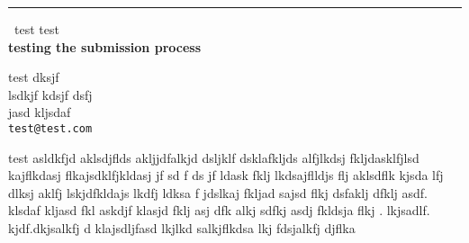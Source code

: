 \documentclass{report}
\begin{document}
\begin{center}
\rule{6in}{1pt} \
{\large test test \\
{\bf testing the submission process}}

test dksjf \\ lsdkjf kdsjf dsfj \\ jasd kljsdaf
\\
{\tt test@test.com}\end{center}

test asldkfjd aklsdjflds akljjdfalkjd dsljklf dsklafkljds alfjlkdsj
fkljdasklfjlsd kajflkdasj flkajsdklfjkldasj jf sd f ds jf ldask fklj
lkdsajflldjs flj aklsdflk kjsda lfj dlksj aklfj lskjdfkldajs lkdfj ldksa
f jdslkaj fkljad sajsd flkj dsfaklj dfklj asdf. klsdaf kljasd fkl askdjf
klasjd fklj asj dfk alkj sdfkj asdj fkldsja flkj . lkjsadlf.
kjdf.dkjsalkfj d klajsdljfasd lkjlkd salkjflkdsa lkj fdsjalkfj djflka
\end{document}
